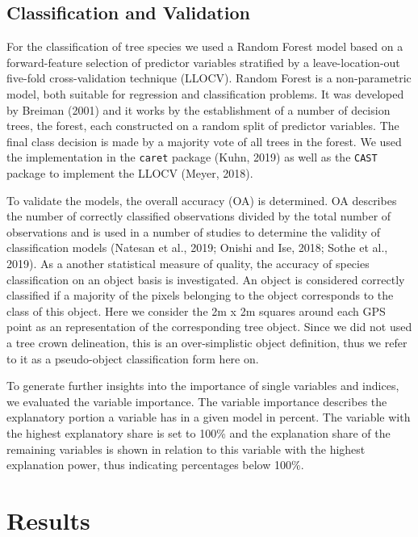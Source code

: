 \documentclass[]{article}
\begin{document}
\hypertarget{classification-and-validation}{%
\subsection{Classification and
Validation}\label{classification-and-validation}}

For the classification of tree species we used a Random Forest model
based on a forward-feature selection of predictor variables stratified
by a leave-location-out five-fold cross-validation technique (LLOCV).
Random Forest is a non-parametric model, both suitable for regression
and classification problems. It was developed by Breiman (2001) and it
works by the establishment of a number of decision trees, the forest,
each constructed on a random split of predictor variables. The final
class decision is made by a majority vote of all trees in the forest. We
used the implementation in the \texttt{caret} package (Kuhn, 2019) as
well as the \texttt{CAST} package to implement the LLOCV (Meyer, 2018).

To validate the models, the overall accuracy (OA) is determined. OA
describes the number of correctly classified observations divided by the
total number of observations and is used in a number of studies to
determine the validity of classification models (Natesan et al., 2019;
Onishi and Ise, 2018; Sothe et al., 2019). As a another statistical
measure of quality, the accuracy of species classification on an object
basis is investigated. An object is considered correctly classified if a
majority of the pixels belonging to the object corresponds to the class
of this object. Here we consider the 2m x 2m squares around each GPS
point as an representation of the corresponding tree object. Since we
did not used a tree crown delineation, this is an over-simplistic object
definition, thus we refer to it as a pseudo-object classification form
here on.

To generate further insights into the importance of single variables and
indices, we evaluated the variable importance. The variable importance
describes the explanatory portion a variable has in a given model in
percent. The variable with the highest explanatory share is set to 100\%
and the explanation share of the remaining variables is shown in
relation to this variable with the highest explanation power, thus
indicating percentages below 100\%.

\hypertarget{results}{%
\section{Results}\label{results}}
\end{document}
